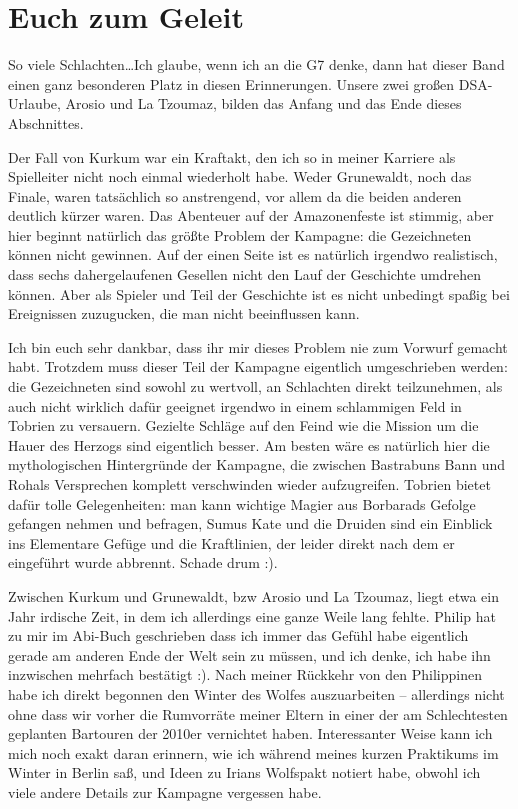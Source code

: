 \chapter{Euch zum Geleit}
So viele Schlachten\dots Ich glaube, wenn ich an die G7 denke, dann hat dieser Band einen ganz besonderen Platz in diesen Erinnerungen.
Unsere zwei großen DSA-Urlaube, Arosio und La Tzoumaz, bilden das Anfang und das Ende dieses Abschnittes.

Der Fall von Kurkum war ein Kraftakt, den ich so in meiner Karriere als Spielleiter nicht noch einmal wiederholt habe.
Weder Grunewaldt, noch das Finale, waren tatsächlich so anstrengend, vor allem da die beiden anderen deutlich kürzer waren.
Das Abenteuer auf der Amazonenfeste ist stimmig, aber hier beginnt natürlich das größte Problem der Kampagne: die Gezeichneten können nicht gewinnen.
Auf der einen Seite ist es natürlich irgendwo realistisch, dass sechs dahergelaufenen Gesellen nicht den Lauf der Geschichte umdrehen können.
Aber als Spieler und Teil der Geschichte ist es nicht unbedingt spaßig bei Ereignissen zuzugucken, die man nicht beeinflussen kann.

Ich bin euch sehr dankbar, dass ihr mir dieses Problem nie zum Vorwurf gemacht habt.
Trotzdem muss dieser Teil der Kampagne eigentlich umgeschrieben werden: die Gezeichneten sind sowohl zu wertvoll, an Schlachten direkt teilzunehmen, als auch nicht wirklich dafür geeignet irgendwo in einem schlammigen Feld in Tobrien zu versauern.
Gezielte Schläge auf den Feind wie die Mission um die Hauer des Herzogs sind eigentlich besser.
Am besten wäre es natürlich hier die mythologischen Hintergründe der Kampagne, die zwischen Bastrabuns Bann und Rohals Versprechen komplett verschwinden wieder aufzugreifen.
Tobrien bietet dafür tolle Gelegenheiten: man kann wichtige Magier aus Borbarads Gefolge gefangen nehmen und befragen, Sumus Kate und die Druiden sind ein Einblick ins Elementare Gefüge und die Kraftlinien, der leider direkt nach dem er eingeführt wurde abbrennt.
Schade drum :).

Zwischen Kurkum und Grunewaldt, bzw Arosio und La Tzoumaz, liegt etwa ein Jahr irdische Zeit, in dem ich allerdings eine ganze Weile lang fehlte.
Philip hat zu mir im Abi-Buch geschrieben dass ich immer das Gefühl habe eigentlich gerade am anderen Ende der Welt sein zu müssen, und ich denke, ich habe ihn inzwischen mehrfach bestätigt :).
Nach meiner Rückkehr von den Philippinen habe ich direkt begonnen den Winter des Wolfes auszuarbeiten -- allerdings nicht ohne dass wir vorher die Rumvorräte meiner Eltern in einer der am Schlechtesten geplanten Bartouren der 2010er vernichtet haben.
Interessanter Weise kann ich mich noch exakt daran erinnern, wie ich während meines kurzen Praktikums im Winter in Berlin saß, und Ideen zu Irians Wolfspakt notiert habe, obwohl ich viele andere Details zur Kampagne vergessen habe.


